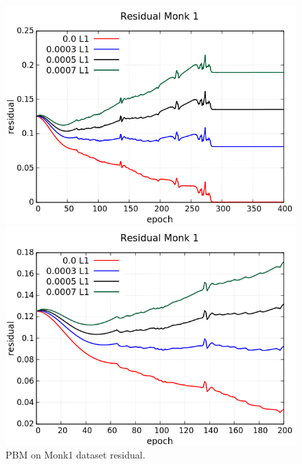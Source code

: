 \begin{figure}[H]
	\centering
	\begin{minipage}[t]{0.5\linewidth}
		\includegraphics[width=\linewidth]{data/PBM/Monk1/Monk1_PBM_Residual_standard.png}
	\end{minipage}%
	\begin{minipage}[t]{0.5\linewidth}
		\includegraphics[width=\linewidth]{data/PBM/Monk1/Monk1_PBM_Residual_zoom.png}
	\end{minipage}
	\caption{PBM on Monk1 dataset residual.}
\end{figure}
